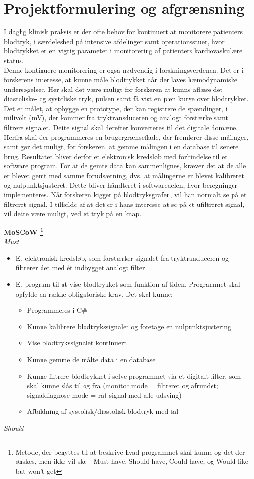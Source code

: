 \chapter{Projektformulering og afgrænsning}
I daglig klinisk praksis er der ofte behov for kontinuert at monitorere patienters blodtryk, i særdeleshed på intensive afdelinger samt operationsstuer, hvor blodtrykket er en vigtig parameter i monitorering af patienters kardiovaskulære status.\\
Denne kontinuere monitorering er også nødvendig i forskningsverdenen. Det er i forskerens interesse, at kunne måle blodtrykket når der laves hæmodynamiske undersøgelser. Her skal det være muligt for forskeren at kunne aflæse det diastoliske- og systoliske tryk, pulsen samt få vist en pæn kurve over blodtrykket. Det er målet, at opbygge en prototype, der kan registrere de spændinger, i milivolt (mV), der kommer fra tryktransduceren og analogt forstærke samt filtrere signalet. Dette signal skal derefter konverteres til det digitale domæne. \\
Herfra skal der programmeres en brugergrænseflade, der fremfører disse målinger, samt gør det muligt, for forskeren, at gemme målingen i en database til senere brug. Resultatet bliver derfor et elektronisk kredsløb med forbindelse til et software program.
For at de gemte data kan sammenlignes, kræver det at de alle er blevet gemt med samme forudsætning, dvs. at målingerne er blevet kalibreret og nulpunktsjusteret. Dette bliver håndteret i softwaredelen, hvor beregninger implementeres. Når forskeren kigger på blodtryksgrafen, vil han normalt se på et filtreret signal. I tilfælde af at det er i hans interesse at se på et ufiltreret signal, vil dette være muligt, ved et tryk på en knap.

\textbf{MoSCoW \footnote{Metode, der benyttes til at beskrive hvad programmet skal kunne og det der ønskes, men ikke vil ske - Must have, Should have, Could have, og Would like but won't get}}
\\
\textit{Must}
\begin{itemize}
\item Et elektronisk kredsløb, som forstærker signalet fra tryktranduceren og filtrerer det med ét indbygget analogt filter
\item Et program til at vise blodtrykket som funktion af tiden. Programmet skal opfylde en række obligatoriske krav. Det skal kunne:
\begin{itemize}
\item Programmeres i C\#
\item Kunne kalibrere blodtrykssignalet og foretage en nulpunktsjustering
\item Vise blodtrykssignalet kontinuert
\item Kunne gemme de målte data i en database
\item Kunne filtrere blodtrykket i selve programmet via et digitalt filter, som skal kunne slås til og fra (monitor mode = filtreret og afrundet; signaldiagnose mode = råt signal med alle udsving)
\item Afbildning af systolisk/diastolisk blodtryk med tal
\end{itemize}
\end{itemize}
\textit{Should}

